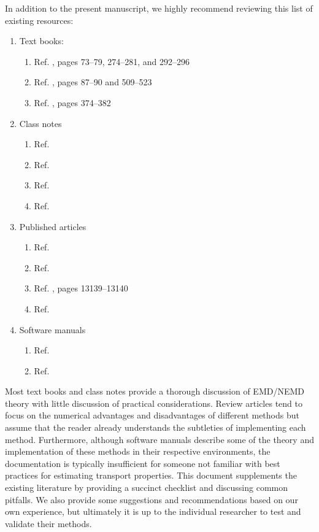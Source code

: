 \documentclass[9pt,bestpractices]{livecoms}
\begin{document}
In addition to the present manuscript, we highly recommend reviewing this list of existing resources:
\begin{enumerate}
	\item Text books:
	\begin{enumerate}
		\item Ref. \cite{Allen2017}, pages 73--79, 274--281, and 292--296
		\item Ref. \cite{Frenkel2002}, pages 87--90 and 509--523
		\item Ref. \cite{Leach2001}, pages 374--382
	\end{enumerate}
	\item Class notes
	\begin{enumerate}
		\item Ref. \cite{PanaNotes}
		\item Ref. \cite{KofkeNotes}
		\item Ref. \cite{MaginnNotes}
		\item Ref. \cite{ShellNotes}

	\end{enumerate}
	\item Published articles
	\begin{enumerate}
		\item Ref. \cite{Chen2009}
		\item Ref. \cite{Hess2002}
		\item Ref. \cite{Nieto2015}, pages 13139--13140
		\item Ref. \cite{Ungerer2007}
	\end{enumerate}
	\item Software manuals
	\begin{enumerate}
		\item Ref. \cite{GROMACS}
		\item Ref. \cite{LAMMPS}
	\end{enumerate}
\end{enumerate}
Most text books and class notes provide a thorough discussion of EMD/NEMD theory with little discussion of practical considerations. Review articles tend to focus on the numerical advantages and disadvantages of different methods but assume that the reader already understands the subtleties of implementing each method. Furthermore, although software manuals describe some of the theory and implementation of these methods in their respective environments, the documentation is typically insufficient for someone not familiar with best practices for estimating transport properties. This document supplements the existing literature by providing a succinct checklist and discussing common pitfalls. We also provide some suggestions and recommendations based on our own experience, but ultimately it is up to the individual researcher to test and validate their methods.
\end{document}
